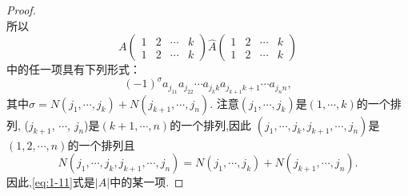 \begin{proof}
\begin{equation*}
  \end{equation*}
  所以
  \begin{equation*}
    A
    \left(\begin{smallmatrix}
      1 & 2 & \cdots & k\\
      1 & 2 & \cdots & k
    \end{smallmatrix}\right)
    \widehat{A}
    \left(\begin{smallmatrix}
      1 & 2 & \cdots & k\\
      1 & 2 & \cdots & k
    \end{smallmatrix}\right)
  \end{equation*}
  中的任一项具有下列形式：
  \begin{equation}\label{eq:1-11}
    (-1)^\sigma a_{j_11}a_{j_22}\cdots a_{j_kk}a_{j_{k+1}k+1}\cdots a_{j_nn},
  \end{equation}
  其中$\sigma = N(j_1,\cdots,j_k)+N(j_{k+1},\cdots,j_n)$. 
  注意$(j_1,\cdots,j_k)$是$(1,\cdots,k)$的一个排列, 
  ($j_{k+1}$, $\cdots$, $j_n$)是$(k+1,\cdots,n)$的一个排列,因此
  $(j_1,\cdots,j_k,j_{k+1},\cdots,j_n)$是$(1,2,\cdots,n)$的一个排列且
  \begin{equation*}    N(j_1,\cdots,j_k,j_{k+1},\cdots,j_n)=N(j_1,\cdots,j_k)+N(j_{k+1},\cdots,j_n).
  \end{equation*}
  因此,\eqref{eq:1-11}式是$|A|$中的某一项.


\end{proof}
